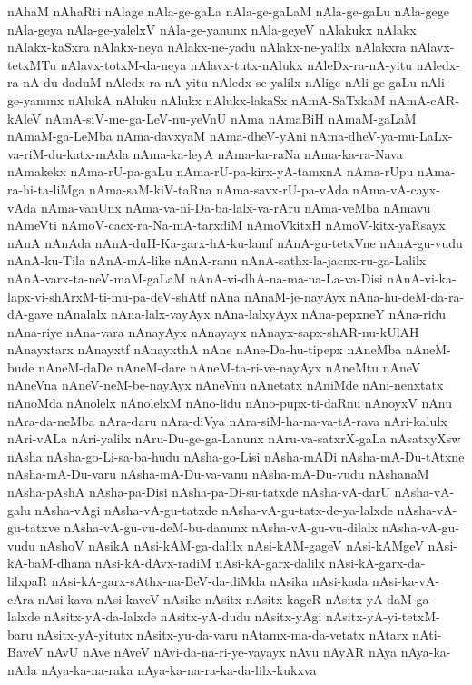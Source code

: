 {nAhaM
nAhaRti
nAlage
nAla-ge-gaLa
nAla-ge-gaLaM
nAla-ge-gaLu
nAla-gege
nAla-geya
nAla-ge-yalelxV
nAla-ge-yanunx
nAla-geyeV
nAlakukx
nAlakx
nAlakx-kaSxra
nAlakx-neya
nAlakx-ne-yadu
nAlakx-ne-yalilx
nAlakxra
nAlavx-tetxMTu
nAlavx-totxM-da-neya
nAlavx-tutx-nAlukx
nAleDx-ra-nA-yitu
nAledx-ra-nA-du-daduM
nAledx-ra-nA-yitu
nAledx-se-yalilx
nAlige
nAli-ge-gaLu
nAli-ge-yanunx
nAlukA
nAluku
nAlukx
nAlukx-lakaSx
nAmA-SaTxkaM
nAmA-cAR-kAleV
nAmA-siV-me-ga-LeV-nu-yeVnU
nAma
nAmaBiH
nAmaM-gaLaM
nAmaM-ga-LeMba
nAma-davxyaM
nAma-dheV-yAni
nAma-dheV-ya-mu-LaLx-va-riM-du-katx-mAda
nAma-ka-leyA
nAma-ka-raNa
nAma-ka-ra-Nava
nAmakekx
nAma-rU-pa-gaLu
nAma-rU-pa-kirx-yA-tamxnA
nAma-rUpu
nAma-ra-hi-ta-liMga
nAma-saM-kiV-taRna
nAma-savx-rU-pa-vAda
nAma-vA-cayx-vAda
nAma-vanUnx
nAma-va-ni-Da-ba-lalx-va-rAru
nAma-veMba
nAmavu
nAmeVti
nAmoV-cacx-ra-Na-mA-tarxdiM
nAmoVkitxH
nAmoV-kitx-yaRsayx
nAnA
nAnAda
nAnA-duH-Ka-garx-hA-ku-lamf
nAnA-gu-tetxVne
nAnA-gu-vudu
nAnA-ku-Tila
nAnA-mA-like
nAnA-ranu
nAnA-sathx-la-jacnx-ru-ga-Lalilx
nAnA-varx-ta-neV-maM-gaLaM
nAnA-vi-dhA-na-ma-na-La-va-Disi
nAnA-vi-ka-lapx-vi-shArxM-ti-mu-pa-deV-shAtf
nAna
nAnaM-je-nayAyx
nAna-hu-deM-da-ra-dA-gave
nAnalalx
nAna-lalx-vayAyx
nAna-lalxyAyx
nAna-pepxneY
nAna-ridu
nAna-riye
nAna-vara
nAnayAyx
nAnayayx
nAnayx-sapx-shAR-nu-kUlAH
nAnayxtarx
nAnayxtf
nAnayxthA
nAne
nAne-Da-hu-tipepx
nAneMba
nAneM-bude
nAneM-daDe
nAneM-dare
nAneM-ta-ri-ve-nayAyx
nAneMtu
nAneV
nAneVna
nAneV-neM-be-nayAyx
nAneVnu
nAnetatx
nAniMde
nAni-nenxtatx
nAnoMda
nAnolelx
nAnolelxM
nAno-lidu
nAno-pupx-ti-daRnu
nAnoyxV
nAnu
nAra-da-neMba
nAra-daru
nAra-diVya
nAra-siM-ha-na-va-tA-rava
nAri-kalulx
nAri-vALa
nAri-yalilx
nAru-Du-ge-ga-Lanunx
nAru-va-satxrX-gaLa
nAsatxyXsw
nAsha
nAsha-go-Li-sa-ba-hudu
nAsha-go-Lisi
nAsha-mADi
nAsha-mA-Du-tAtxne
nAsha-mA-Du-varu
nAsha-mA-Du-va-vanu
nAsha-mA-Du-vudu
nAshanaM
nAsha-pAshA
nAsha-pa-Disi
nAsha-pa-Di-su-tatxde
nAsha-vA-darU
nAsha-vA-galu
nAsha-vAgi
nAsha-vA-gu-tatxde
nAsha-vA-gu-tatx-de-ya-lalxde
nAsha-vA-gu-tatxve
nAsha-vA-gu-vu-deM-bu-danunx
nAsha-vA-gu-vu-dilalx
nAsha-vA-gu-vudu
nAshoV
nAsikA
nAsi-kAM-ga-dalilx
nAsi-kAM-gageV
nAsi-kAMgeV
nAsi-kA-baM-dhana
nAsi-kA-dAvx-radiM
nAsi-kA-garx-dalilx
nAsi-kA-garx-da-lilxpaR
nAsi-kA-garx-sAthx-na-BeV-da-diMda
nAsika
nAsi-kada
nAsi-ka-vA-cAra
nAsi-kava
nAsi-kaveV
nAsike
nAsitx
nAsitx-kageR
nAsitx-yA-daM-ga-lalxde
nAsitx-yA-da-lalxde
nAsitx-yA-dudu
nAsitx-yAgi
nAsitx-yA-yi-tetxM-baru
nAsitx-yA-yitutx
nAsitx-yu-da-varu
nAtamx-ma-da-vetatx
nAtarx
nAti-BaveV
nAvU
nAve
nAveV
nAvi-da-na-ri-ye-vayayx
nAvu
nAyAR
nAya
nAya-ka-nAda
nAya-ka-na-raka
nAya-ka-na-ra-ka-da-lilx-kukxva
}
